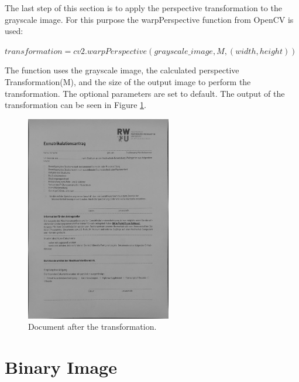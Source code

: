 \documentclass[twocolumn,10pt]{asme2ej}
\begin{document}
The last step of this section is to apply the perspective transformation to the grayscale image. 
For this purpose the warpPerspective function from OpenCV\cite{opencv_warpPerspective} is used:
\begin{center}
    \noindent
    $transformation = cv2.warpPerspective(grayscale\_image, M, (width, height))$
\end{center}
The function uses the grayscale image, the calculated perspective Transformation(M), and the size of the 
output image to perform the transformation. The optional parameters are set to default.
The output of the transformation can be seen in Figure \ref{fig:transformation}.

\begin{figure}[H]
    \centerline{\includegraphics[width=2.5in]{output/hoch_3_6_transformation.jpg}}
    \caption{Document after the transformation.}
    \label{fig:transformation}
\end{figure}




\section{Binary Image}
\end{document}
